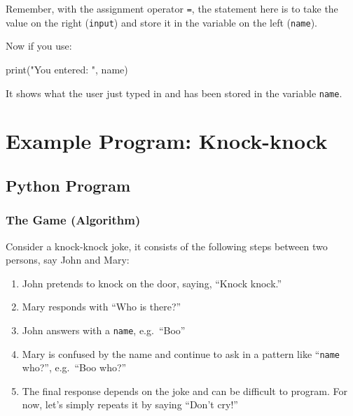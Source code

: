\documentclass[
  letterpaper,
]{scrbook}
\newenvironment{Shaded}{\begin{snugshade}}{\end{snugshade}}
\newcommand{\BuiltInTok}[1]{\textcolor[rgb]{0.00,0.23,0.31}{#1}}
\newcommand{\NormalTok}[1]{\textcolor[rgb]{0.00,0.23,0.31}{#1}}
\newcommand{\StringTok}[1]{\textcolor[rgb]{0.13,0.47,0.30}{#1}}
\providecommand{\tightlist}{%
  \setlength{\itemsep}{0pt}\setlength{\parskip}{0pt}}
\begin{document}
Remember, with the assignment operator \texttt{=}, the statement here is
to take the value on the right (\texttt{input}) and store it in the
variable on the left (\texttt{name}).

Now if you use:

\begin{Shaded}
\begin{Highlighting}[]
\BuiltInTok{print}\NormalTok{(}\StringTok{"You entered: "}\NormalTok{, name)}
\end{Highlighting}
\end{Shaded}

It shows what the user just typed in and has been stored in the variable
\texttt{name}.

\section*{Example Program:
Knock-knock}\label{example-program-knock-knock}


\subsection*{Python Program}\label{python-program}

\subsubsection*{The Game (Algorithm)}\label{the-game-algorithm}

Consider a knock-knock joke, it consists of the following steps between
two persons, say John and Mary:

\begin{enumerate}
\def\labelenumi{\arabic{enumi}.}
\tightlist
\item
  John pretends to knock on the door, saying, ``Knock knock.''
\item
  Mary responds with ``Who is there?''
\item
  John answers with a \texttt{name}, e.g.~``Boo''
\item
  Mary is confused by the name and continue to ask in a pattern like
  ``\texttt{name} who?'', e.g.~``Boo who?''
\item
  The final response depends on the joke and can be difficult to
  program. For now, let's simply repeats it by saying ``Don't cry!''
\end{enumerate}
\end{document}
